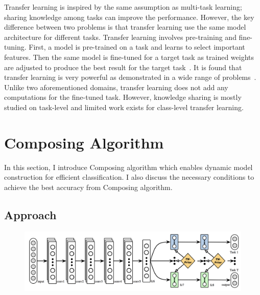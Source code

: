 \documentclass{article}
\begin{document}
Transfer learning is inspired by the same assumption as multi-task learning; sharing knowledge among tasks can improve the performance. However, the key difference between two problems is that transfer learning use the same model architecture for different tasks. Transfer learning involves pre-training and fine-tuning. First, a model is pre-trained on a task and learns to select important features. Then the same model is fine-tuned for a target task as trained weights are adjusted to produce the best result for the target task~\cite{yosinski2014transferable}. It is found that transfer learning is very powerful as demonstrated in a wide range of problems~\cite{raina2007self, egan2004effects, glorot2011domain}. Unlike two aforementioned domains, transfer learning does not add any computations for the fine-tuned task. However, knowledge sharing is mostly studied on task-level and limited work exists for class-level transfer learning.

\section{Composing Algorithm}

In this section, I introduce Composing algorithm which enables dynamic model construction for efficient classification. I also discuss the necessary conditions to achieve the best accuracy from Composing algorithm.

\subsection{Approach}

\begin{figure}[t!]
  \centering
  \includegraphics[scale=0.32,trim={0mm 0mm 0mm 0mm},clip]{long2017learning.png}
\end{figure}
\end{document}
